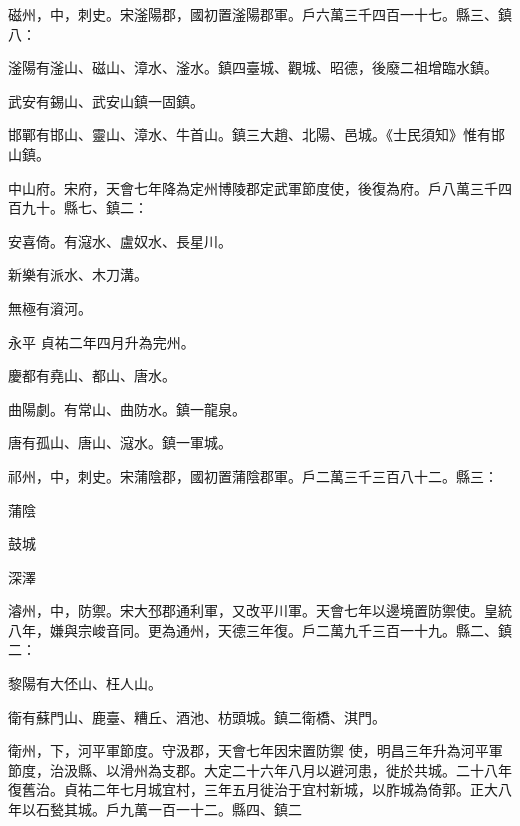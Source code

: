 \begin{pinyinscope}
 磁州，中，刺史。宋滏陽郡，國初置滏陽郡軍。戶六萬三千四百一十七。縣三、鎮八：



 滏陽有滏山、磁山、漳水、滏水。鎮四臺城、觀城、昭德，後廢二祖增臨水鎮。



 武安有錫山、武安山鎮一固鎮。



 邯鄲有邯山、靈山、漳水、牛首山。鎮三大趙、北陽、邑城。《士民須知》惟有邯山鎮。



 中山府。宋府，天會七年降為定州博陵郡定武軍節度使，後復為府。戶八萬三千四百九十。縣七、鎮二：



 安喜倚。有滱水、盧奴水、長星川。



 新樂有派水、木刀溝。



 無極有澬河。



 永平
 貞祐二年四月升為完州。



 慶都有堯山、都山、唐水。



 曲陽劇。有常山、曲防水。鎮一龍泉。



 唐有孤山、唐山、滱水。鎮一軍城。



 祁州，中，刺史。宋蒲陰郡，國初置蒲陰郡軍。戶二萬三千三百八十二。縣三：



 蒲陰



 鼓城



 深澤



 濬州，中，防禦。宋大邳郡通利軍，又改平川軍。天會七年以邊境置防禦使。皇統八年，嫌與宗峻音同。更為通州，天德三年復。戶二萬九千三百一十九。縣二、鎮二：



 黎陽有大伾山、枉人山。



 衛有蘇門山、鹿臺、糟丘、酒池、枋頭城。鎮二衛橋、淇門。



 衛州，下，河平軍節度。守汲郡，天會七年因宋置防禦
 使，明昌三年升為河平軍節度，治汲縣、以滑州為支郡。大定二十六年八月以避河患，徙於共城。二十八年復舊治。貞祐二年七月城宜村，三年五月徙治于宜村新城，以胙城為倚郭。正大八年以石甃其城。戶九萬一百一十二。縣四、鎮二




\end{pinyinscope}
